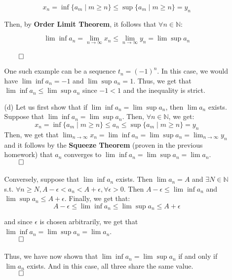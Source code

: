\documentclass[11pt]{article}
\newcommand{\nats}{\mathbb{N}}
\begin{document}
\begin{itemize}
\begin{itemize}
                $$x_n = \inf{\{a_m \mid m \geq n\}} \leq \sup{\{a_m \mid m \geq
                n\}} = y_n$$

                Then, by \textbf{Order Limit Theorem}, it follows that $\forall
                n \in \nats$:

                $$\lim{\inf{a_n}} = \lim_{n \to \infty}x_n \leq \lim_{n \to
                \infty} y_n = \lim{\sup{a_n}}$$\\
                $\qed$

                One such example can be a sequence $t_n = (-1)^n$. In this
                case, we would have $\lim{\inf{a_n}} = -1$ and $\lim{\sup{a_n}}
                = 1$. Thus, we get that $\lim{\inf{a_n}} \leq \lim{\sup{a_n}}$
                since $-1 < 1$ and the inequality is strict.

            \item[(d)]
                Let us first show that if $\lim{\inf{a_n}} = \lim{\sup{a_n}}$,
                then $\lim a_n$ exists. Suppose that $\lim{\inf{a_n}} =
                \lim{\sup{a_n}}$. Then, $\forall n \in \nats$, we get: $$x_n =
                \inf{\{a_m \mid m \geq n\}} \leq a_n \leq \sup{\{a_m \mid m
                \geq n\}} = y_n$$ Then, we get that $\lim_{n \to \infty}x_n =
                \lim{\inf{a_n}} = \lim{\sup{a_n}} = \lim_{n \to \infty}y_n$ and
                it follows by the \textbf{Squeeze Theorem} (proven in the
                previous homework) that $a_n$ converges to $\lim{\inf{a_n}} =
                \lim{\sup{a_n}} = \lim{a_n}$.\\
                $\qed$
                \\\\
                Conversely, suppose that $\lim{\inf{a_n}}$ exists. Then $\lim
                a_n = A$ and $\exists N \in \nats$ s.t. $\forall n \geq N, A -
                \epsilon < a_n < A + \epsilon, \forall \epsilon > 0$. Then $A -
                \epsilon \leq \lim{\inf{a_n}}$ and $\lim{\sup{a_n}} \leq A +
                \epsilon$. Finally, we get that: $$A - \epsilon \leq
                \lim{\inf{a_n}} \leq \lim{\sup{a_n}} \leq A + \epsilon$$

                and since $\epsilon$ is chosen arbitrarily, we get that $\lim{
                    \inf{a_n}} = \lim{\sup{a_n}} = \lim{a_n}$.\\
                $\qed$
                \\\\
                Thus, we have now shown that $\lim{\inf{a_n}} =
                \lim{\sup{a_n}}$ if and only if $\lim a_n$ exists. And in this
                case, all three share the same value.\\
                $\qed$
        \end{itemize}


\end{itemize}
\end{document}
